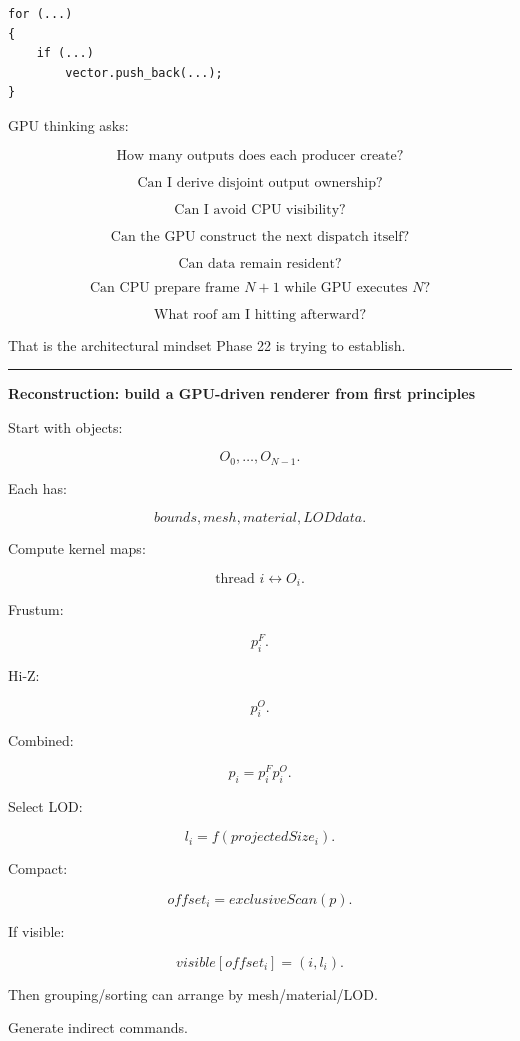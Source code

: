 \protect{}\label{p10-cpu-push}%
\begin{verbatim}
for (...)
{
    if (...)
        vector.push_back(...);
}
\end{verbatim}

GPU thinking asks:

\[
\text{How many outputs does each producer create?}
\]

\[
\text{Can I derive disjoint output ownership?}
\]

\[
\text{Can I avoid CPU visibility?}
\]

\[
\text{Can the GPU construct the next dispatch itself?}
\]

\[
\text{Can data remain resident?}
\]

\[
\text{Can CPU prepare frame }N+1
\text{ while GPU executes }N?
\]

\[
\text{What roof am I hitting afterward?}
\]

That is the architectural mindset Phase 22 is trying to establish.

\begin{center}\rule{0.5\linewidth}{0.5pt}\end{center}

\textbf{Reconstruction: build a GPU-driven renderer from first principles}

Start with objects:

\[
O_0,\dots,O_{N-1}.
\]

Each has:

\[
bounds,
mesh,
material,
LOD data.
\]

Compute kernel maps:

\[
\text{thread }i
\leftrightarrow
O_i.
\]

Frustum:

\[
p_i^{F}.
\]

Hi-Z:

\[
p_i^{O}.
\]

Combined:

\[
p_i=
p_i^F p_i^O.
\]

Select LOD:

\[
l_i=f(projectedSize_i).
\]

Compact:

\[
offset_i=
exclusiveScan(p).
\]

If visible:

\[
visible[offset_i]
=
(i,l_i).
\]

Then grouping/sorting can arrange by mesh/material/LOD.

Generate indirect commands.

